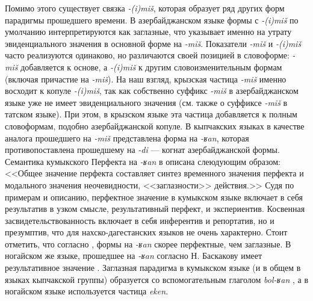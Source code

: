 \par Помимо этого существует связка \textit{-(i)miš}, которая образует ряд других форм парадигмы прошедшего времени. В азербайджанском языке формы с \textit{-(i)miš} по умолчанию интерпретируются как заглазные, что указывает именно на утрату эвиденциального значения в основной форме на \textit{-miš}. Показатели \textit{-miš} и \textit{-(i)miš} часто реализуются одинаково, но различаются своей позицией в словоформе: \textit{-miš} добавляется к основе, а  \textit{-(i)miš} к другим словоизменительным формам (включая причастие на \textit{-miš}). На наш взгляд, крызская частица \textit{-miš} именно восходит к копуле \textit{-(i)miš}, так как собственно суффикс \textit{-miš} в азербайджанском языке уже не имеет эвиденциального значения (см. также \citep[173]{johanson2006} о суффиксе \textit{-miš} в татском языке). При этом, в крызском языке эта частица добавляется к полным словоформам, подобно азербайджанской копуле. В кыпчакских языках в качестве аналога прошедшего на \textit{-miš} представлена форма на \textit{-ʁan}, которая противопоставлена прошедшему на \textit{-di} --- когнат азербайджанской формы. Семантика кумыкского Перфекта на \textit{-ʁan} в \citep[335]{abdullaevaetal2014} описана слеюдующим образом: <<Общее значение перфекта составляет синтез временного значения перфекта и модального значения неочевидности, <<заглазности>> действия.>> Судя по примерам и описанию, перфектное значение в кумыкском языке включает в себя результатив в узком смысле, результативный перфект, и экспериентив. Косвенная засвидетельствованность включает в себя инферентив и репортатив, но и презумптив, что для нахско-дагестанских языков не очень характерно. Стоит отметить, что согласно \citep{johanson2018}, формы на \textit{-ʁan} скорее перфектные, чем заглазные. В ногайском же языке, прошедшее на \textit{-ʁan} согласно Н. Баскакову имеет результативное значение \citep{baskakov1940}. Заглазная парадигма в кумыкском языке (и в общем в языках кыпчакской группы) образуется со вспомогательным глаголом \textit{bol-ʁan} \citep[335]{abdullaevaetal2014}, а в ногайском языке используется частица \textit{eken}.
